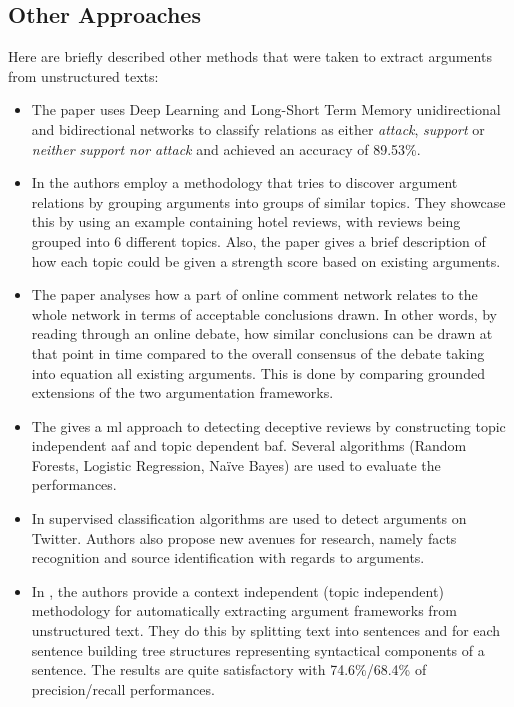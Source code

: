     \subsection{Other Approaches}
        Here are briefly described other methods that were taken to extract arguments from unstructured texts:
        \begin{itemize}
            \item The \autocite{Cocarascu2017IdentifyingAA} paper uses Deep Learning and Long-Short Term Memory unidirectional and bidirectional networks to classify relations as either \textit{attack}, \textit{support} or \textit{neither support nor attack} and achieved an accuracy of 89.53\%. 
            
            \item In \autocite{Cocarascu2017MiningBA} the authors employ a methodology that tries to discover argument relations by grouping arguments into groups of similar topics. They showcase this by using an example containing hotel reviews, with reviews being grouped into 6 different topics. Also, the paper gives a brief description of how each topic could be given a strength score based on existing arguments.
            
            \item The \autocite{ApproxToTruth} paper analyses how a part of online comment network relates to the whole network in terms of acceptable conclusions drawn. In other words, by reading through an online debate, how similar conclusions can be drawn at that point in time compared to the overall consensus of the debate taking into equation all existing arguments. This is done by comparing grounded extensions of the two argumentation frameworks.
            
            \item The \autocite{Cocarascu2016DetectingDR} gives a \gls{ml} approach to detecting deceptive reviews by constructing topic independent \gls{aaf} and topic dependent \gls{baf}. Several algorithms (Random Forests, Logistic Regression, Na{\"i}ve Bayes) are used to evaluate the performances.
            
            \item In \autocite{Dusmanu2017ArgumentMO} supervised classification algorithms are used to detect arguments on Twitter. Authors also propose new avenues for research, namely facts recognition and source identification with regards to arguments.
            
            \item In \autocite{Lippi2015ContextIndependentCD}, the authors provide a context independent (topic independent) methodology for automatically extracting argument frameworks from unstructured text. They do this by splitting text into sentences and for each sentence building tree structures representing syntactical components of a sentence. The results are quite satisfactory with 74.6\%/68.4\% of precision/recall performances.
        \end{itemize}